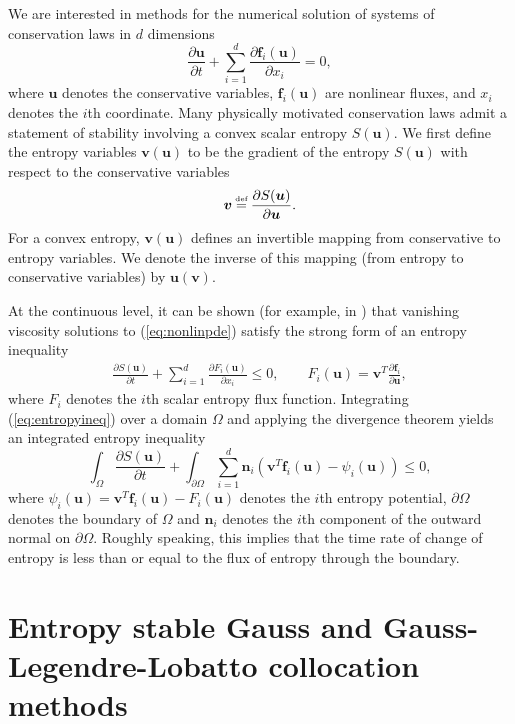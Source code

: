 \documentclass[review,onefignum,onetabnum,final]{siamart171218}
\newcommand{\pd}[2]{\frac{\partial#1}{\partial#2}}
\newcommand{\LRp}[1]{\left( #1 \right)}
\newcommand\myeq{\mathrel{\stackrel{\makebox[0pt]{\mbox{\normalfont\tiny def}}}{=}}}
\begin{document}
We are interested in methods for the numerical solution of systems of conservation laws in $d$ dimensions
\begin{equation}
\pd{\bm{u}}{t} + \sum_{i=1}^d \pd{\bm{f}_i\LRp{\bm{u}}}{x_i} = 0,
\label{eq:nonlinpde}
\end{equation}
where $\bm{u}$ denotes the conservative variables, $\bm{f}_i(\bm{u})$ are nonlinear fluxes, and $x_i$ denotes the $i$th coordinate.  Many physically motivated conservation laws admit a statement of stability involving a convex scalar entropy $S(\bm{u})$.  We first define the entropy variables $\bm{v}(\bm{u})$ to be the gradient of the entropy $S(\bm{u})$ with respect to the conservative variables 
\[
\bm{v} \myeq \pd{S(\bm{u})}{\bm{u}}.  
\]
For a convex entropy, $\bm{v}(\bm{u})$ defines an invertible mapping from conservative to entropy variables.  We denote the inverse of this mapping (from entropy to conservative variables) by $\bm{u}(\bm{v})$.  

At the continuous level, it can be shown (for example, in \cite{dafermos2005compensated}) that vanishing viscosity solutions to (\ref{eq:nonlinpde}) satisfy the strong form of an entropy inequality 
\begin{gather}
\pd{S(\bm{u})}{t} + \sum_{i=1}^d \pd{F_i(\bm{u})}{x_i} \leq 0, \qquad F_i(\bm{u}) = \bm{v}^T\pd{\bm{f}_i}{\bm{u}}, 
\label{eq:entropyineq}
\end{gather}
where $F_i$ denotes the $i$th scalar entropy flux function.  Integrating (\ref{eq:entropyineq}) over a domain $\Omega$ and applying the divergence theorem yields an integrated entropy inequality
\begin{equation}
\int_{\Omega} \pd{S(\bm{u})}{t} + \int_{\partial \Omega} \sum_{i=1}^d \bm{n}_i \LRp{\bm{v}^T\bm{f}_i(\bm{u}) - \psi_i(\bm{u})} \leq 0,
\label{eq:weakentropyineq}
\end{equation}
where $\psi_i(\bm{u}) = \bm{v}^T\bm{f}_i(\bm{u}) - F_i(\bm{u})$ denotes the $i$th entropy potential, $\partial \Omega$ denotes the boundary of $\Omega$ and $\bm{n}_i$ denotes the $i$th component of the outward normal on $\partial \Omega$.  Roughly speaking, this implies that the time rate of change of entropy is less than or equal to the flux of entropy through the boundary.


\section{Entropy stable Gauss and Gauss-Legendre-Lobatto collocation methods}
\label{sec:1}
\end{document}
